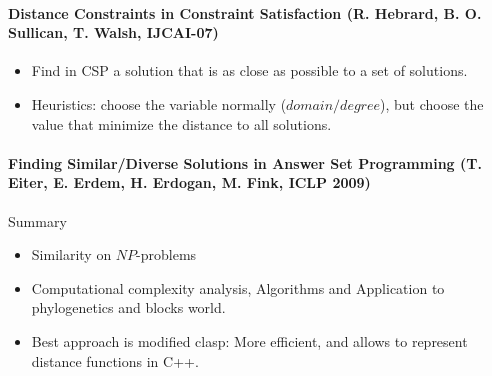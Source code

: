 \newpage
\paragraph{Distance Constraints in Constraint Satisfaction (R. Hebrard, B. O. Sullican, T. Walsh, IJCAI-07)}

\begin{itemize}
\item Find in CSP a solution that is as close as possible to a set of solutions.
\item Heuristics: choose the variable normally ($domain/degree$), 
      but choose the value that minimize the distance to all solutions.
\end{itemize}



\newpage
\paragraph{Finding Similar/Diverse Solutions in Answer Set Programming (T. Eiter, E. Erdem, H. Erdogan, M. Fink, ICLP 2009)} 
$ $\\
\flushleft 
Summary
\begin{itemize}
\item Similarity on $NP$-problems
\item
    Computational complexity analysis, Algorithms and Application to phylogenetics and blocks world.
\item
    Best approach is modified clasp: More efficient, and allows to represent distance functions in C++.
\end{itemize}

